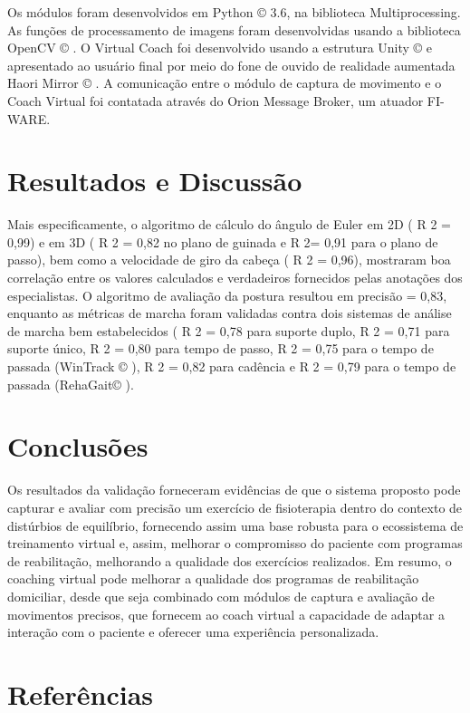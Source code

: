 \documentclass[10pt,a4paper,compsoc]{IEEEtran}
\begin{document}
Os módulos foram desenvolvidos em Python © 3.6, na biblioteca Multiprocessing. As funções de processamento de imagens foram desenvolvidas usando a biblioteca OpenCV © . O Virtual Coach foi desenvolvido usando a estrutura Unity © e apresentado ao usuário final por meio do fone de ouvido de realidade aumentada Haori Mirror © . A comunicação entre o módulo de captura de movimento e o Coach Virtual foi contatada através do Orion Message Broker, um atuador FI-WARE.

\section{Resultados e Discussão}

Mais especificamente, o algoritmo de cálculo do ângulo de Euler em 2D ( R 2 = 0,99) e em 3D ( R 2 = 0,82 no plano de guinada e R 2= 0,91 para o plano de passo), bem como a velocidade de giro da cabeça ( R 2 = 0,96), mostraram boa correlação entre os valores calculados e verdadeiros fornecidos pelas anotações dos especialistas. O algoritmo de avaliação da postura resultou em precisão = 0,83, enquanto as métricas de marcha foram validadas contra dois sistemas de análise de marcha bem estabelecidos ( R 2 = 0,78 para suporte duplo, R 2 = 0,71 para suporte único, R 2 = 0,80 para tempo de passo, R 2 = 0,75 para o tempo de passada (WinTrack © ), R 2 = 0,82 para cadência e R 2 = 0,79 para o tempo de passada (RehaGait© ).

\section{Conclusões}

Os resultados da validação forneceram evidências de que o sistema proposto pode capturar e avaliar com precisão um exercício de fisioterapia dentro do contexto de distúrbios de equilíbrio, fornecendo assim uma base robusta para o ecossistema de treinamento virtual e, assim, melhorar o compromisso do paciente com programas de reabilitação, melhorando a qualidade dos exercícios realizados. Em resumo, o coaching virtual pode melhorar a qualidade dos programas de reabilitação domiciliar, desde que seja combinado com módulos de captura e avaliação de movimentos precisos, que fornecem ao coach virtual a capacidade de adaptar a interação com o paciente e oferecer uma experiência personalizada.

\section{Referências}
\end{document}
